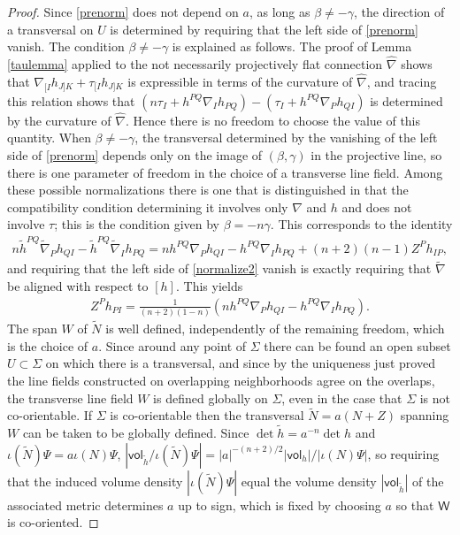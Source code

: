 \documentclass [leqno, 10pt]{amsart}
\theoremstyle{definition}
\numberwithin{equation}{section}
\newcommand{\imt}{\iota}
\newcommand{\vol}{\mathsf{vol}}
\newcommand{\nm}{\mathsf{W}}
\newcommand{\be}{\beta}
\newcommand{\ga}{\gamma}
\newcommand{\hnabla}{\widehat{\nabla}}
\newcommand{\tnabla}{\tilde{\nabla}}
\begin{document}
\begin{proof}
Since \eqref{prenorm} does not depend on $a$, as long as $\be \neq -\ga$, the direction of a transversal on $U$ is determined by requiring that the left side of \eqref{prenorm} vanish. The condition $\be \neq -\ga$ is explained as follows. The proof of Lemma \ref{taulemma} applied to the not necessarily projectively flat connection $\hnabla$ shows that $\nabla_{[I}h_{J]K} + \tau_{[I}h_{J]K}$ is expressible in terms of the curvature of $\hnabla$, and tracing this relation shows that $(n\tau_{I} + h^{PQ}\nabla_{I}h_{PQ}) - (\tau_{I} + h^{PQ}\nabla_{P}h_{QI})$ is determined by the curvature of $\hnabla$. Hence there is no freedom to choose the value of this quantity. When $\be \neq -\ga$, the transversal determined by the vanishing of the left side of \eqref{prenorm} depends only on the image of $(\be, \ga)$ in the projective line, so there is one parameter of freedom in the choice of a transverse line field. Among these possible normalizations there is one that is distinguished in that the compatibility condition determining it involves only $\nabla$ and $h$ and does not involve $\tau$; this is the condition given by $\be = -n \ga$. This corresponds to the identity
\begin{align}\label{normalize2}
n\tilde{h}^{PQ}\tnabla_{P}h_{QI}  - \tilde{h}^{PQ}\tnabla_{I}h_{PQ} = nh^{PQ}\nabla_{P}h_{QI} - h^{PQ}\nabla_{I}h_{PQ} + (n+2)(n-1)Z^{P}h_{IP},
\end{align}
and requiring that the left side of \eqref{normalize2} vanish is exactly requiring that $\tnabla$ be aligned with respect to $[h]$. This yields
\begin{align}\label{zdetnonflat}
Z^{P}h_{PI} =  \tfrac{1}{(n+2)(1-n)}\left(nh^{PQ}\nabla_{P}h_{QI} - h^{PQ}\nabla_{I}h_{PQ}\right).
\end{align}
The span $W$ of $\tilde{N}$ is well defined, independently of the remaining freedom, which is the choice of $a$. Since around any point of $\Sigma$ there can be found an open subset $U \subset \Sigma$ on which there is a transversal, and since by the uniqueness just proved the line fields constructed on overlapping neighborhoods agree on the overlaps, the transverse line field $W$ is defined globally on $\Sigma$, even in the case that $\Sigma$ is not co-orientable. If $\Sigma$ is co-orientable then the transversal $\tilde{N} = a(N + Z)$ spanning $W$ can be taken to be globally defined. Since $\det \tilde{h} = a^{-n}\det h$ and $\imt(\tilde{N})\Psi = a \imt(N)\Psi$, $|\vol_{\tilde{h}}/\imt(\tilde{N})\Psi| = |a|^{-(n+2)/2}|\vol_{h}|/|\imt(N)\Psi|$, so requiring that the induced volume density $|\imt(\tilde{N})\Psi|$ equal the volume density $|\vol_{\tilde{h}}|$ of the associated metric determines $a$ up to sign, which is fixed by choosing $a$ so that $\nm$ is co-oriented.


\end{proof}
\end{document}
